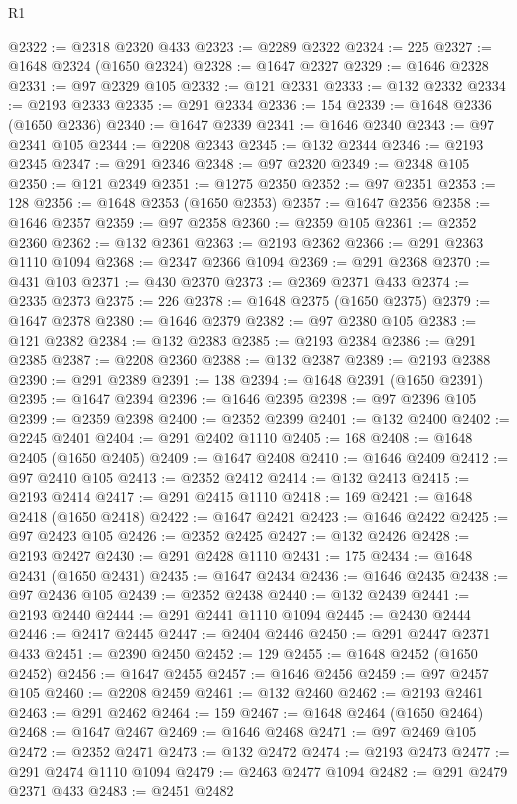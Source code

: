 \begin{lexlean}{R1}
\begin{coremodule}
{{{{{{{{{{{{{{{{{{{{{{{{{{{{{{{{{{{{{{{{{{{{{{{{{{{{{{{{{{{{{{{{{{{{{{{{{{{{{{{{{{{{{{{{{{{{{{{{{{{{{{{{{{{{{{{{{{{{{{{{{{{{{{{{{{{{{{{{{{{{{{{{{{{{{{{{{{{{{{{{{{{{{{{{{{{{{{{{{{{{{{{{{{@2322 := @2318 @2320 @433
@2323 := @2289 @2322
@2324 := 225
@2327 := @1648 @2324 (@1650 @2324)
@2328 := @1647 @2327
@2329 := @1646 @2328
@2331 := @97 @2329 @105
@2332 := @121 @2331
@2333 := @132 @2332
@2334 := @2193 @2333
@2335 := @291 @2334
@2336 := 154
@2339 := @1648 @2336 (@1650 @2336)
@2340 := @1647 @2339
@2341 := @1646 @2340
@2343 := @97 @2341 @105
@2344 := @2208 @2343
@2345 := @132 @2344
@2346 := @2193 @2345
@2347 := @291 @2346
@2348 := @97 @2320
@2349 := @2348 @105
@2350 := @121 @2349
@2351 := @1275 @2350
@2352 := @97 @2351
@2353 := 128
@2356 := @1648 @2353 (@1650 @2353)
@2357 := @1647 @2356
@2358 := @1646 @2357
@2359 := @97 @2358
@2360 := @2359 @105
@2361 := @2352 @2360
@2362 := @132 @2361
@2363 := @2193 @2362
@2366 := @291 @2363 @1110 @1094
@2368 := @2347 @2366 @1094
@2369 := @291 @2368
@2370 := @431 @103
@2371 := @430 @2370
@2373 := @2369 @2371 @433
@2374 := @2335 @2373
@2375 := 226
@2378 := @1648 @2375 (@1650 @2375)
@2379 := @1647 @2378
@2380 := @1646 @2379
@2382 := @97 @2380 @105
@2383 := @121 @2382
@2384 := @132 @2383
@2385 := @2193 @2384
@2386 := @291 @2385
@2387 := @2208 @2360
@2388 := @132 @2387
@2389 := @2193 @2388
@2390 := @291 @2389
@2391 := 138
@2394 := @1648 @2391 (@1650 @2391)
@2395 := @1647 @2394
@2396 := @1646 @2395
@2398 := @97 @2396 @105
@2399 := @2359 @2398
@2400 := @2352 @2399
@2401 := @132 @2400
@2402 := @2245 @2401
@2404 := @291 @2402 @1110
@2405 := 168
@2408 := @1648 @2405 (@1650 @2405)
@2409 := @1647 @2408
@2410 := @1646 @2409
@2412 := @97 @2410 @105
@2413 := @2352 @2412
@2414 := @132 @2413
@2415 := @2193 @2414
@2417 := @291 @2415 @1110
@2418 := 169
@2421 := @1648 @2418 (@1650 @2418)
@2422 := @1647 @2421
@2423 := @1646 @2422
@2425 := @97 @2423 @105
@2426 := @2352 @2425
@2427 := @132 @2426
@2428 := @2193 @2427
@2430 := @291 @2428 @1110
@2431 := 175
@2434 := @1648 @2431 (@1650 @2431)
@2435 := @1647 @2434
@2436 := @1646 @2435
@2438 := @97 @2436 @105
@2439 := @2352 @2438
@2440 := @132 @2439
@2441 := @2193 @2440
@2444 := @291 @2441 @1110 @1094
@2445 := @2430 @2444
@2446 := @2417 @2445
@2447 := @2404 @2446
@2450 := @291 @2447 @2371 @433
@2451 := @2390 @2450
@2452 := 129
@2455 := @1648 @2452 (@1650 @2452)
@2456 := @1647 @2455
@2457 := @1646 @2456
@2459 := @97 @2457 @105
@2460 := @2208 @2459
@2461 := @132 @2460
@2462 := @2193 @2461
@2463 := @291 @2462
@2464 := 159
@2467 := @1648 @2464 (@1650 @2464)
@2468 := @1647 @2467
@2469 := @1646 @2468
@2471 := @97 @2469 @105
@2472 := @2352 @2471
@2473 := @132 @2472
@2474 := @2193 @2473
@2477 := @291 @2474 @1110 @1094
@2479 := @2463 @2477 @1094
@2482 := @291 @2479 @2371 @433
@2483 := @2451 @2482
}}}}}}}}}}}}}}}}}}}}}}}}}}}}}}}}}}}}}}}}}}}}}}}}}}}}}}}}}}}}}}}}}}}}}}}}}}}}}}}}}}}}}}}}}}}}}}}}}}}}}}}}}}}}}}}}}}}}}}}}}}}}}}}}}}}}}}}}}}}}}}}}}}}}}}}}}}}}}}}}}}}}}}}}}}}}}}}}}}}}}}}}}}
\end{coremodule}
\end{lexlean}
